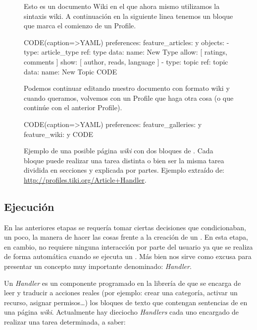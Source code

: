 \begin{figure}
\begin{pyglist}[language=text]
  Esto es un documento Wiki en el que ahora mismo utilizamos 
  la sintaxis wiki. A continuación en la siguiente linea 
  tenemos un bloque que marca el comienzo de un Profile.

  {CODE(caption=>YAML)}
  preferences: 
    feature_articles: y
  objects:
   -
    type: article_type
    ref: type
    data:
      name: New Type
      allow: [ ratings, comments ]
      show: [ author, reads, language ]
   -
    type: topic
    ref: topic
    data:
      name: New Topic
  {CODE}

  Podemos continuar editando nuestro documento con formato wiki 
  y cuando queramos, volvemos con un Profile que haga otra cosa
  (o que continúe con el anterior Profile).

  {CODE(caption=>YAML)}
  preferences: 
   feature_galleries: y
   feature_wiki: y
  {CODE}
\end{pyglist}
\caption{Ejemplo de una posible página \textit{wiki} con dos bloques de \profiles{}. Cada bloque puede realizar una tarea distinta o bien ser la misma tarea dividida en secciones y explicada por partes. Ejemplo extraído de: \url{http://profiles.tiki.org/Article+Handler}.}
\end{figure}

\subsection{Ejecución}
\label{section:ejecucion-profiles}

En las anteriores etapas se requería tomar ciertas decisiones que condicionaban, un poco, la manera de hacer las cosas frente a la creación de un \profile{}. En esta etapa, en cambio, no requiere ninguna interacción por parte del usuario ya que se realiza de forma automática cuando se ejecuta un \profile{}. Más bien nos sirve como excusa para presentar un concepto muy importante denominado: \textit{Handler}.

Un \textit{Handler} es un componente programado en la librería de \profiles{} que se encarga de leer y traducir a acciones reales (por ejemplo: crear una categoría, activar un recurso, asignar permisos\ldots{}) los bloques de texto que contengan sentencias de \profiles{} en una página \textit{wiki}. Actualmente hay dieciocho \textit{Handlers} cada uno encargado de realizar una tarea determinada, a saber:

